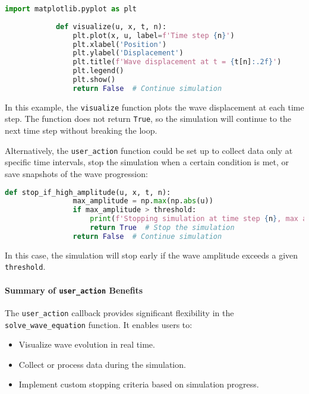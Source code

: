 \documentclass{article}
\begin{document}
		\begin{lstlisting}[language=Python, caption=Example of \texttt{user\_action} for Visualization]
			import matplotlib.pyplot as plt
			
			def visualize(u, x, t, n):
				plt.plot(x, u, label=f'Time step {n}')
				plt.xlabel('Position')
				plt.ylabel('Displacement')
				plt.title(f'Wave displacement at t = {t[n]:.2f}')
				plt.legend()
				plt.show()
				return False  # Continue simulation
		\end{lstlisting}
		
		In this example, the \texttt{visualize} function plots the wave displacement at each time step. The function does not return \texttt{True}, so the simulation will continue to the next time step without breaking the loop.
		
		Alternatively, the \texttt{user\_action} function could be set up to collect data only at specific time intervals, stop the simulation when a certain condition is met, or save snapshots of the wave progression:
		
		\begin{lstlisting}[language=Python, caption=Example of Early Stopping with \texttt{user\_action}]
			def stop_if_high_amplitude(u, x, t, n):
				max_amplitude = np.max(np.abs(u))
				if max_amplitude > threshold:
					print(f'Stopping simulation at time step {n}, max amplitude reached: {max_amplitude}')
					return True  # Stop the simulation
				return False  # Continue simulation
		\end{lstlisting}
		
		In this case, the simulation will stop early if the wave amplitude exceeds a given \texttt{threshold}.
		
		\paragraph{Summary of \texttt{user\_action} Benefits}
		
		The \texttt{user\_action} callback provides significant flexibility in the \texttt{solve\_wave\_equation} function. It enables users to:
		\begin{itemize}
			\item Visualize wave evolution in real time.
			\item Collect or process data during the simulation.
			\item Implement custom stopping criteria based on simulation progress.
		\end{itemize}
		
\end{document}
